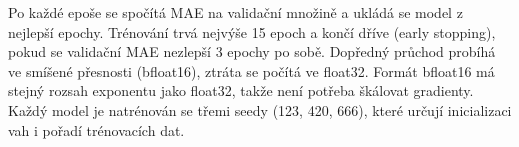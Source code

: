 Po každé epoše se spočítá MAE na validační množině a ukládá se model z nejlepší epochy.
Trénování trvá nejvýše 15 epoch a končí dříve (early stopping), pokud se validační MAE
nezlepší 3 epochy po sobě. Dopředný průchod probíhá ve smíšené přesnosti (bfloat16), ztráta
se počítá ve float32. Formát bfloat16 má stejný rozsah exponentu jako float32, takže není
potřeba škálovat gradienty. Každý model je natrénován se třemi seedy
(123, 420, 666), které určují inicializaci vah i pořadí trénovacích dat.